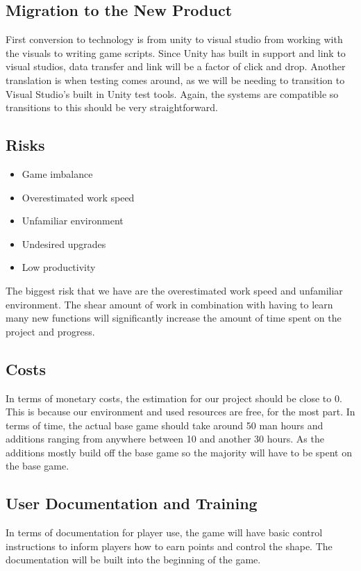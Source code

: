 \documentclass[12pt, titlepage]{article}
\begin{document}
\subsection{Migration to the New Product}
First conversion to technology is from unity to visual studio from working with the visuals to writing game scripts. Since Unity has built in support and link to visual studios, data transfer and link will be a factor of click and drop. Another translation is when testing comes around, as we will be needing to transition to Visual Studio’s built in Unity test tools.  Again, the systems are compatible so transitions to this should be very straightforward.


\subsection{Risks}
\begin{itemize}
\item Game imbalance
\item Overestimated work speed
\item Unfamiliar environment
\item Undesired upgrades
\item Low productivity
\end{itemize}

\indent The biggest risk that we have are the overestimated work speed and unfamiliar environment. The shear amount of work in combination with having to learn many new functions will significantly increase the amount of time spent on the project and progress. 


\subsection{Costs}
In terms of monetary costs, the estimation for our project should be close to 0. This is because our environment and used resources are free, for the most part. In terms of time, the actual base game should take around 50 man hours and additions ranging from anywhere between 10 and another 30 hours. As the additions mostly build off the base game so the majority will have to be spent on the base game. 

\subsection{User Documentation and Training}
In terms of documentation for player use, the game will have basic control instructions to inform players how to earn points and control the shape. The documentation will be built into the beginning of the game.\\
\end{document}
